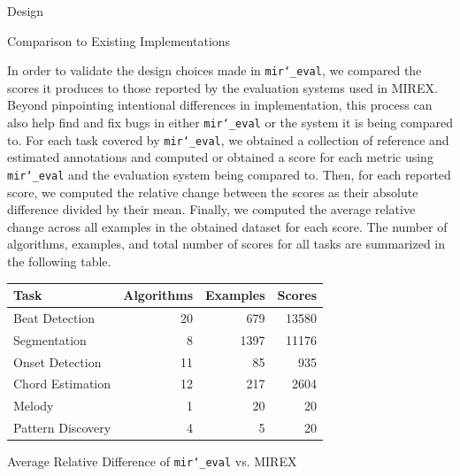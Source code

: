 \documentclass[paperwidth=120cm,paperheight=150cm,portrait,fontscale=.22,margin=5cm,lmargin=.2cm,rmargin=.2cm]{baposter}
\def\mireval{\texttt{mir\char`_eval}}
\begin{document}
\begin{poster}
\begin{posterbox}[name=design,column=0,below=abstract]{Design}
\end{posterbox}

\begin{posterbox}[name=comparison,column=1]{Comparison to Existing Implementations}


In order to validate the design choices made in \mireval{}, we compared the scores it produces to those reported by the evaluation systems used in MIREX.
Beyond pinpointing intentional differences in implementation, this process can also help find and fix bugs in either \mireval{} or the system it is being compared to.
For each task covered by \mireval{}, we obtained a collection of reference and estimated annotations and computed or obtained a score for each metric using \mireval{} and the evaluation system being compared to.
Then, for each reported score, we computed the relative change between the scores as their absolute difference divided by their mean.
Finally, we computed the average relative change across all examples in the obtained dataset for each score.
The number of algorithms, examples, and total number of scores for all tasks are summarized in the following table.

\begin{center}
\begin{tabular}{l r r r}
\toprule
Task & Algorithms & Examples & Scores\\
\midrule
Beat Detection & 20 & 679 & 13580\\
Segmentation & 8 & 1397 & 11176 \\
Onset Detection & 11 & 85 & 935 \\
Chord Estimation & 12 & 217 & 2604 \\
Melody & 1 & 20 & 20 \\
Pattern Discovery & 4 & 5 & 20 \\
\bottomrule
\end{tabular}
\end{center}

\vspace{-2.5mm}

\end{posterbox}

\begin{posterbox}[name=average,column=0,below=design,span=2]{Average Relative Difference of \mireval{} vs. MIREX}


\end{posterbox}
\end{poster}
\end{document}
